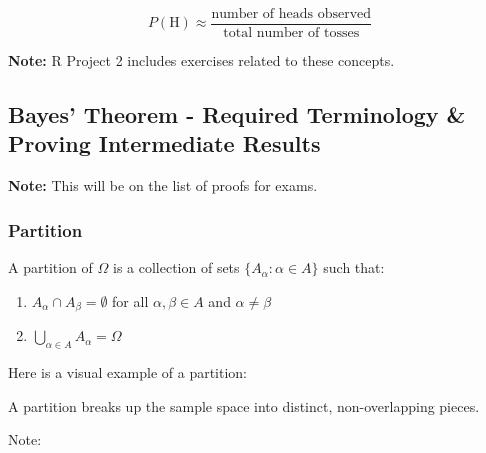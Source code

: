 \documentclass{article}
\begin{document}
    \[
    P(\text{H}) \approx \frac{\text{number of heads observed}}{\text{total number of tosses}}
    \]

    \textbf{Note:} R Project 2 includes exercises related to these concepts.

    \subsection*{Bayes' Theorem - Required Terminology \& Proving Intermediate Results}
    
    \textbf{Note:} This will be on the list of proofs for exams.
    
    \subsubsection*{Partition}
    
    A partition of $\Omega$ is a collection of sets $\{A_\alpha : \alpha \in A\}$ such that:
    
    \begin{enumerate}
        \item $A_\alpha \cap A_\beta = \emptyset$ for all $\alpha, \beta \in A$ and $\alpha \neq \beta$
        \item $\bigcup_{\alpha \in A} A_\alpha = \Omega$
    \end{enumerate}

    Here is a visual example of a partition:
    
    \begin{center}
    \end{center}
    
    A partition breaks up the sample space into distinct, non-overlapping pieces.

    Note:
\end{document}
